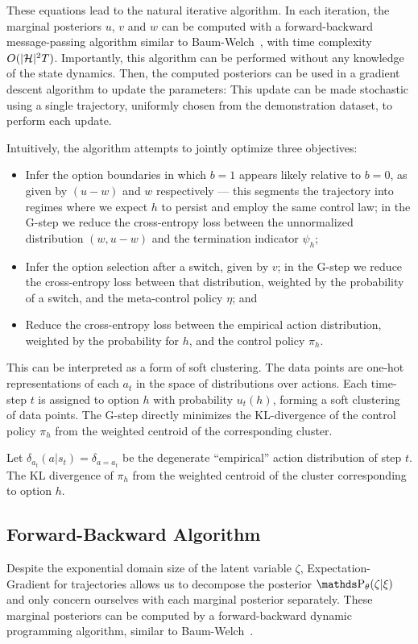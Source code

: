 These equations lead to the natural iterative algorithm. In each iteration, the marginal posteriors $u$, $v$ and $w$ can be computed with a forward-backward message-passing algorithm similar to Baum-Welch~\cite{baum1972equality}, with time complexity $O(|\mathcal{H}|^2 T)$. Importantly, this algorithm can be performed without any knowledge of the state dynamics. 
Then, the computed posteriors can be used in a gradient descent algorithm to update the parameters:
This update can be made stochastic using a single trajectory, uniformly chosen from the demonstration dataset, to perform each update.

Intuitively, the algorithm attempts to jointly optimize three objectives:
\begin{itemize}
    \item Infer the option boundaries in which $b=1$ appears likely relative to $b=0$, as given by $(u-w)$ and $w$ respectively --- this segments the trajectory into regimes where we expect $h$ to persist and employ the same control law; in the G-step we reduce the cross-entropy loss between the unnormalized distribution $(w,u-w)$ and the termination indicator $\psi_h$;
    \item Infer the option selection after a switch, given by $v$; in the G-step we reduce the cross-entropy loss between that distribution, weighted by the probability of a switch, and the meta-control policy $\eta$; and
    \item Reduce the cross-entropy loss between the empirical action distribution, weighted by the probability for $h$, and the control policy $\pi_h$.
\end{itemize}
This can be interpreted as a form of soft clustering. 
The data points are one-hot representations of each $a_t$ in the space of distributions over actions.
Each time-step $t$ is assigned to option $h$ with probability $u_t(h)$, forming a soft clustering of data points.
The G-step directly minimizes the KL-divergence of the control policy $\pi_h$ from the weighted centroid of the corresponding cluster.

Let $\delta_{a_t}(a|s_t)=\delta_{a=a_t}$ be the degenerate ``empirical'' action distribution of step $t$.
The KL divergence of $\pi_h$ from the weighted centroid of the cluster corresponding to option $h$.

\subsection*{Forward-Backward Algorithm}
Despite the exponential domain size of the latent variable $\zeta$, Expectation-Gradient for trajectories allows us to decompose the posterior $\p_\theta(\zeta \given \xi)$ and only concern ourselves with each marginal posterior separately. These marginal posteriors can be computed by a forward-backward dynamic programming algorithm, similar to Baum-Welch~\cite{?}.

